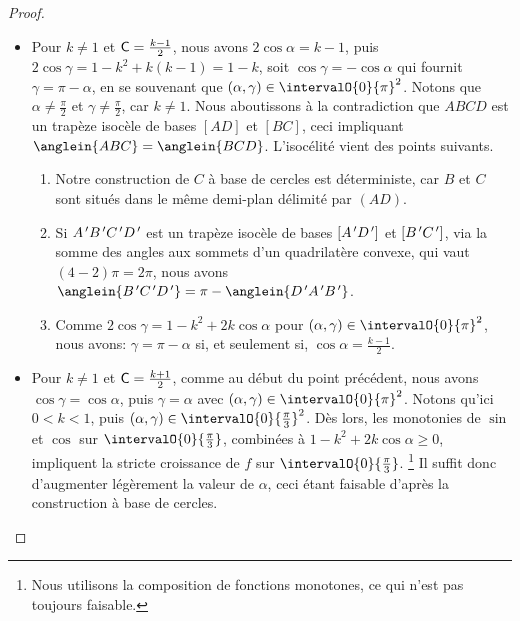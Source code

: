 \begin{proof}
\begin{itemize}
	    \item Pour $k \neq 1$ et $\mathsf{C} = \frac{k - 1}{2}$,
	    nous avons $2\cos \alpha = k - 1$, 
	    puis 
	    $2 \cos \gamma = 1 - k^2 + k(k - 1) = 1 - k$,
	    soit
	    $\cos \gamma = - \cos \alpha$ qui fournit
	    $\gamma = \pi - \alpha$, en se souvenant que $(\alpha , \gamma) \in \intervalO{0}{\pi}^2$.
	    Notons que $\alpha \neq \frac{\pi}{2}$ et $\gamma \neq \frac{\pi}{2}$, car $k \neq 1$. 
	    Nous aboutissons à la contradiction que $ABCD$ est un trapèze isocèle de bases $[AD]$ et $[BC]$, ceci impliquant $\anglein{ABC} = \anglein{BCD}$. 
	    L'isocélité vient des points suivants.
	    \begin{enumerate}
	        \item Notre construction de $C$ à base de cercles est déterministe, car $B$ et $C$ sont situés dans le même demi-plan délimité par $(AD)$.

	        \item Si $A^{\,\prime} B^{\,\prime} C^{\,\prime} D^{\,\prime}$ est un trapèze isocèle de bases $[A^{\,\prime} D^{\,\prime}]$ et $[B^{\,\prime} C^{\,\prime}]$, via la somme des angles aux sommets d'un quadrilatère convexe, qui vaut $(4 - 2) \pi = 2 \pi$, nous avons
	        $\anglein{\primeit{B} \primeit{C} \primeit{D}} = \pi - \anglein{\primeit{D} \primeit{A} \primeit{B}}$.

	        \item Comme $2 \cos \gamma = 1 - k^2 + 2 k \cos \alpha$ pour $(\alpha, \gamma) \in \intervalO{0}{\pi}^2$,
	        nous avons:
	        $\gamma = \pi - \alpha$ si, et seulement si, $\cos \alpha = \frac{k - 1}{2}$.
	    \end{enumerate}


	    \item Pour $k \neq 1$ et $\mathsf{C} = \frac{k + 1}{2}$,
	    comme au début du point précédent,
	    nous avons $\cos \gamma = \cos \alpha$, puis $\gamma = \alpha$ avec $(\alpha , \gamma) \in \intervalO{0}{\pi}^2$.
	    Notons qu'ici $0 < k < 1$, puis $(\alpha , \gamma) \in \intervalO{0}{\frac{\pi}{3}}^2$.
	    Dès lors, les monotonies de $\sin$ et $\cos$ sur $\intervalO{0}{\frac{\pi}{3}}$, combinées à $1 - k^2 + 2 k \cos \alpha \geq 0$, impliquent la stricte croissance de $f$ sur $\intervalO{0}{\frac{\pi}{3}}$.%
	    \footnote{
	    	Nous utilisons la composition de fonctions monotones, ce qui n'est pas toujours faisable.
	    }
	    Il suffit donc d'augmenter légèrement la valeur de  $\alpha$, ceci étant faisable d'après la construction à base de cercles.
	\end{itemize}
	
	\null\vspace{-6ex}
\end{proof}


